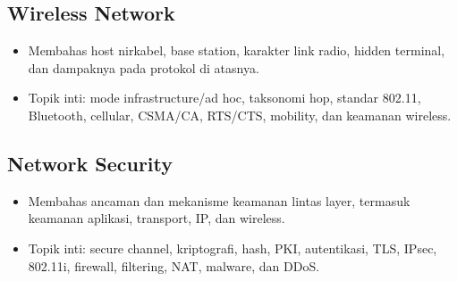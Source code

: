 \documentclass[11pt,a4paper]{article}
\begin{document}
\subsection{Wireless Network}
\begin{itemize}
    \item Membahas host nirkabel, base station, karakter link radio, hidden terminal, dan dampaknya pada protokol di atasnya.
    \item Topik inti: mode infrastructure/ad hoc, taksonomi hop, standar 802.11, Bluetooth, cellular, CSMA/CA, RTS/CTS, mobility, dan keamanan wireless.
\end{itemize}

\subsection{Network Security}
\begin{itemize}
    \item Membahas ancaman dan mekanisme keamanan lintas layer, termasuk keamanan aplikasi, transport, IP, dan wireless.
    \item Topik inti: secure channel, kriptografi, hash, PKI, autentikasi, TLS, IPsec, 802.11i, firewall, filtering, NAT, malware, dan DDoS.
\end{itemize}

\newpage


\newpage


\newpage


\newpage


\newpage

\end{document}
